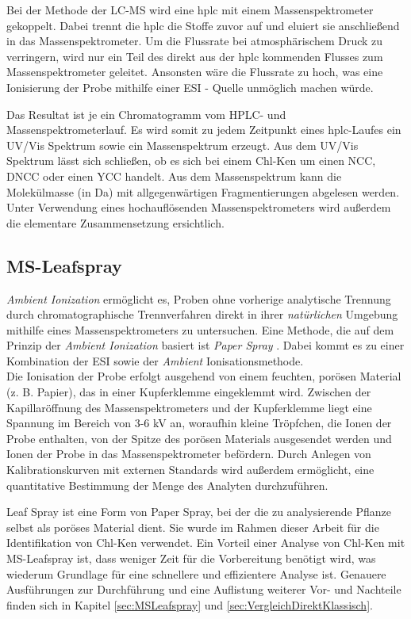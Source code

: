 Bei der Methode der LC-MS wird eine \gls{hplc} mit einem Massenspektrometer gekoppelt. Dabei trennt die \gls{hplc} die Stoffe zuvor auf und eluiert sie anschließend in das Massenspektrometer. \cite[S. 217-218]{MassSpectrometry} Um die Flussrate bei atmosphärischem Druck zu verringern, wird nur ein Teil des direkt aus der \gls{hplc} kommenden Flusses zum Massenspektrometer geleitet. Ansonsten wäre die Flussrate zu hoch, was eine Ionisierung der Probe mithilfe einer \gls{ESI} - Quelle unmöglich machen würde. \cite[S. 221]{MassSpectrometry} 

Das Resultat ist je ein Chromatogramm vom HPLC- und Massenspektrometerlauf. Es wird somit zu jedem Zeitpunkt eines \gls{hplc}-Laufes ein UV/Vis Spektrum sowie ein Massenspektrum erzeugt. Aus dem UV/Vis Spektrum lässt sich schließen, ob es sich bei einem \gls{Chl-K}en um einen \gls{NCC}, \gls{DNCC} oder einen \gls{YCC} handelt. Aus dem Massenspektrum kann die Molekülmasse (in Da) mit allgegenwärtigen Fragmentierungen abgelesen werden. Unter Verwendung eines hochauflösenden Massenspektrometers wird außerdem die elementare Zusammensetzung ersichtlich. \\

\subsection{MS-Leafspray} \label{sec:MSLeafsprayTheoretisch}

\textit{Ambient Ionization} \cite{AmbientIonisation} ermöglicht es, Proben ohne vorherige analytische Trennung durch chromatographische Trennverfahren direkt in ihrer \textit{natürlichen} Umgebung mithilfe eines Massenspektrometers zu untersuchen. Eine Methode, die auf dem Prinzip der \textit{Ambient Ionization} basiert ist \textit{Paper Spray} \cite{PaperSpray}. Dabei  kommt es zu einer Kombination der \gls{ESI} sowie der \textit{Ambient} Ionisationsmethode. \cite{PaperSpray}\\

Die Ionisation der Probe erfolgt ausgehend von einem feuchten, porösen Material (z. B. Papier), das in einer Kupferklemme eingeklemmt wird. Zwischen der Kapillaröffnung des Massenspektrometers und der Kupferklemme liegt eine Spannung im Bereich von 3-6 kV an, woraufhin kleine Tröpfchen, die Ionen der Probe enthalten, von der Spitze des porösen Materials ausgesendet werden und Ionen der Probe in das Massenspektrometer befördern. \cite{RapidScreeningLeafSpray} Durch Anlegen von Kalibrationskurven mit externen Standards wird außerdem ermöglicht, eine quantitative Bestimmung der Menge des Analyten durchzuführen. \cite{LeafSpray}

Leaf Spray ist eine Form von Paper Spray, bei der die zu analysierende Pflanze selbst als poröses Material dient. Sie wurde im Rahmen dieser Arbeit für die Identifikation von \gls{Chl-K}en verwendet. Ein Vorteil einer Analyse von \gls{Chl-K}en mit MS-Leafspray ist, dass weniger Zeit für die Vorbereitung benötigt wird, was wiederum Grundlage für eine schnellere und effizientere Analyse ist. Genauere Ausführungen zur Durchführung und eine Auflistung weiterer Vor- und Nachteile finden sich in Kapitel \ref{sec:MSLeafspray} und \ref{sec:VergleichDirektKlassisch}.\\